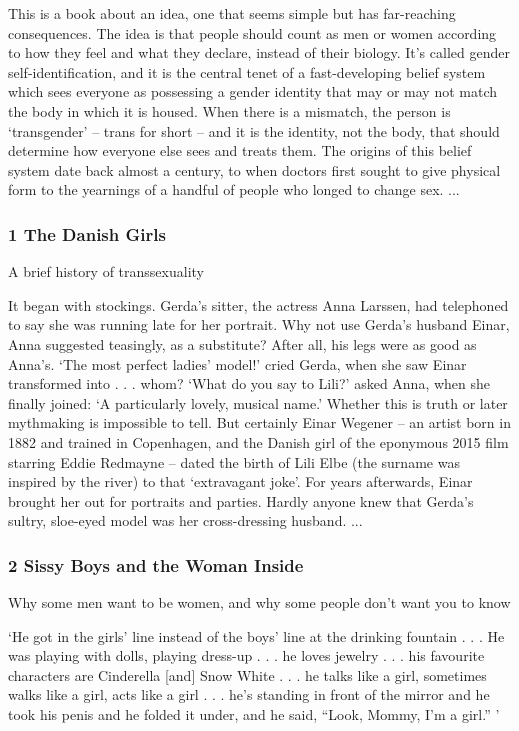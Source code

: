 \documentclass[10pt,titlepage]{book}
\begin{document}
This is a book about an idea, one that seems simple but has far-reaching consequences. The idea is that people should count as men or women according to how they feel and what they declare, instead of their biology. It’s called gender self-identification, and it is the central tenet of a fast-developing belief system which sees everyone as possessing a gender identity that may or may not match the body in which it is housed. When there is a mismatch, the person is ‘transgender’ – trans for short – and it is the identity, not the body, that should determine how everyone else sees and treats them. The origins of this belief system date back almost a century, to when doctors first sought to give physical form to the yearnings of a handful of people who longed to change sex.
...

\subsubsection{1 The Danish Girls}

A brief history of transsexuality

It began with stockings. Gerda’s sitter, the actress Anna Larssen, had telephoned to say she was running late for her portrait. Why not use Gerda’s husband Einar, Anna suggested teasingly, as a substitute? After all, his legs were as good as Anna’s. ‘The most perfect ladies’ model!’ cried Gerda, when she saw Einar transformed into . . . whom? ‘What do you say to Lili?’ asked Anna, when she finally joined: ‘A particularly lovely, musical name.’ Whether this is truth or later mythmaking is impossible to tell. But certainly Einar Wegener – an artist born in 1882 and trained in Copenhagen, and the Danish girl of the eponymous 2015 film starring Eddie Redmayne – dated the birth of Lili Elbe (the surname was inspired by the river) to that ‘extravagant joke’. For years afterwards, Einar brought her out for portraits and parties. Hardly anyone knew that Gerda’s sultry, sloe-eyed model was her cross-dressing husband.
...

\subsubsection{2 Sissy Boys and the Woman Inside}

Why some men want to be women, and why some people don’t want you to know

‘He got in the girls’ line instead of the boys’ line at the drinking fountain . . . He was playing with dolls, playing dress-up . . . he loves jewelry . . . his favourite characters are Cinderella [and] Snow White . . . he talks like a girl, sometimes walks like a girl, acts like a girl . . . he’s standing in front of the mirror and he took his penis and he folded it under, and he said, “Look, Mommy, I’m a girl.” ’
\end{document}

